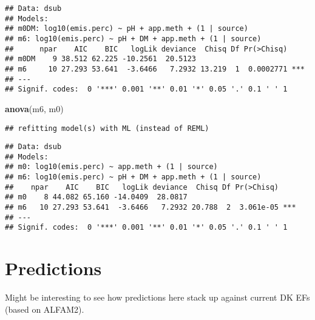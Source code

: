 \documentclass[
]{article}
\newenvironment{Shaded}{\begin{snugshade}}{\end{snugshade}}
\newcommand{\AttributeTok}[1]{\textcolor[rgb]{0.13,0.29,0.53}{#1}}
\newcommand{\FunctionTok}[1]{\textcolor[rgb]{0.13,0.29,0.53}{\textbf{#1}}}
\newcommand{\NormalTok}[1]{#1}
\newcommand{\OtherTok}[1]{\textcolor[rgb]{0.56,0.35,0.01}{#1}}
\newcommand{\SpecialCharTok}[1]{\textcolor[rgb]{0.81,0.36,0.00}{\textbf{#1}}}
\begin{document}
\begin{verbatim}
## Data: dsub
## Models:
## m0DM: log10(emis.perc) ~ pH + app.meth + (1 | source)
## m6: log10(emis.perc) ~ pH + DM + app.meth + (1 | source)
##      npar    AIC    BIC   logLik deviance  Chisq Df Pr(>Chisq)    
## m0DM    9 38.512 62.225 -10.2561  20.5123                         
## m6     10 27.293 53.641  -3.6466   7.2932 13.219  1  0.0002771 ***
## ---
## Signif. codes:  0 '***' 0.001 '**' 0.01 '*' 0.05 '.' 0.1 ' ' 1
\end{verbatim}

\begin{Shaded}
\begin{Highlighting}[]
\FunctionTok{anova}\NormalTok{(m6, m0)}
\end{Highlighting}
\end{Shaded}

\begin{verbatim}
## refitting model(s) with ML (instead of REML)
\end{verbatim}

\begin{verbatim}
## Data: dsub
## Models:
## m0: log10(emis.perc) ~ app.meth + (1 | source)
## m6: log10(emis.perc) ~ pH + DM + app.meth + (1 | source)
##    npar    AIC    BIC   logLik deviance  Chisq Df Pr(>Chisq)    
## m0    8 44.082 65.160 -14.0409  28.0817                         
## m6   10 27.293 53.641  -3.6466   7.2932 20.788  2  3.061e-05 ***
## ---
## Signif. codes:  0 '***' 0.001 '**' 0.01 '*' 0.05 '.' 0.1 ' ' 1
\end{verbatim}

\hypertarget{predictions}{%
\section{Predictions}\label{predictions}}

Might be interesting to see how predictions here stack up against
current DK EFs (based on ALFAM2).

\begin{Shaded}
\end{Shaded}
\end{document}
